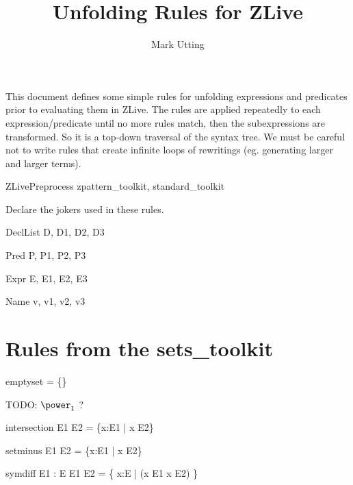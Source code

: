 \documentclass{article}
\title{Unfolding Rules for ZLive}
\author{Mark Utting}
\begin{document}
\maketitle

This document defines some simple rules for unfolding expressions 
and predicates prior to evaluating them in ZLive.  The rules are
applied repeatedly to each expression/predicate until no more rules
match, then the subexpressions are transformed.  So it is a top-down
traversal of the syntax tree.  We must be careful not to write rules
that create infinite loops of rewritings (eg. generating larger and
larger terms).


\begin{zsection}
  \SECTION ZLivePreprocess \parents zpattern\_toolkit, standard\_toolkit
\end{zsection}

Declare the jokers used in these rules.

\begin{zedjoker}{DeclList} D, D1, D2, D3 \end{zedjoker}
\begin{zedjoker}{Pred} P, P1, P2, P3 \end{zedjoker}
\begin{zedjoker}{Expr} E, E1, E2, E3 \end{zedjoker}
\begin{zedjoker}{Name} v, v1, v2, v3 \end{zedjoker}

\newcommand{\unfoldsTo}{\mathrel{\leadsto}}


\section{Rules from the sets\_toolkit}

\begin{zedrule}{emptyset}
   \emptyset = \{\}
\end{zedrule}

TODO: $\power_1$ ?

\begin{zedrule}{intersection}
   E1 \cap E2 = \{x:E1 | x \in E2\}
\end{zedrule}

\begin{zedrule}{setminus}
   E1 \setminus E2 = \{x:E1 | x \notin E2\}
\end{zedrule}

\begin{zedrule}{symdiff}
  \proviso E1 : \power E
\derives
   E1 \symdiff E2 = \{ x:E | \lnot (x \in E1 \iff x \in E2) \}
\end{zedrule}
\end{document}
